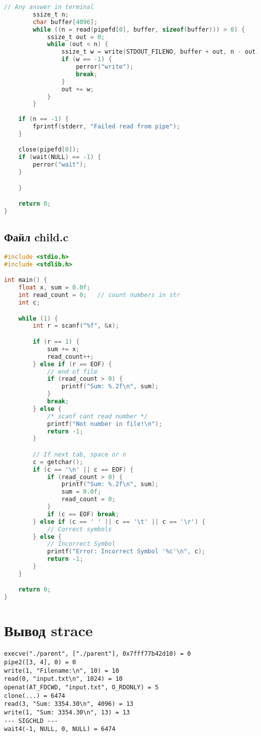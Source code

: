 \begin{lstlisting}[language=C,caption={Код программы родительского процесса},captionpos=b]
        // Any answer in terminal
        ssize_t n;
        char buffer[4096];
        while ((n = read(pipefd[0], buffer, sizeof(buffer))) > 0) {
            ssize_t out = 0;
            while (out < n) {
                ssize_t w = write(STDOUT_FILENO, buffer + out, n - out);
                if (w == -1) {
                    perror("write");
                    break;
                }
                out += w;
            }
        }
          
    if (n == -1) {
        fprintf(stderr, "Failed read from pipe");
    }

    close(pipefd[0]);
    if (wait(NULL) == -1) {
        perror("wait");
    }

    }

    return 0;
}
\end{lstlisting}

\subsection*{Файл child.c}

\begin{lstlisting}[language=C,caption={Код программы дочернего процесса},captionpos=b]
#include <stdio.h>
#include <stdlib.h>

int main() {
    float x, sum = 0.0f;
    int read_count = 0;   // count numbers in str
    int c;

    while (1) {
        int r = scanf("%f", &x);

        if (r == 1) {
            sum += x;
            read_count++;
        } else if (r == EOF) {
            // end of file
            if (read_count > 0) {
                printf("Sum: %.2f\n", sum);
            }
            break;
        } else {
            /* scanf cant read number */
            printf("Not number in file!\n");
            return -1;
        }

        // If next tab, space or n
        c = getchar();
        if (c == '\n' || c == EOF) {
            if (read_count > 0) {
                printf("Sum: %.2f\n", sum);
                sum = 0.0f;
                read_count = 0;
            }
            if (c == EOF) break;
        } else if (c == ' ' || c == '\t' || c == '\r') {
            // Correct symbols
        } else {
            // Incorrect Symbol
            printf("Error: Incorrect Symbol '%c'\n", c);
            return -1;
        }
    }

    return 0;
}
\end{lstlisting}

\section{Вывод strace}

\begin{verbatim}
execve("./parent", ["./parent"], 0x7fff77b42d10) = 0
pipe2([3, 4], 0) = 0
write(1, "Filename:\n", 10) = 10
read(0, "input.txt\n", 1024) = 10
openat(AT_FDCWD, "input.txt", O_RDONLY) = 5
clone(...) = 6474
read(3, "Sum: 3354.30\n", 4096) = 13
write(1, "Sum: 3354.30\n", 13) = 13
--- SIGCHLD --- 
wait4(-1, NULL, 0, NULL) = 6474
\end{verbatim}